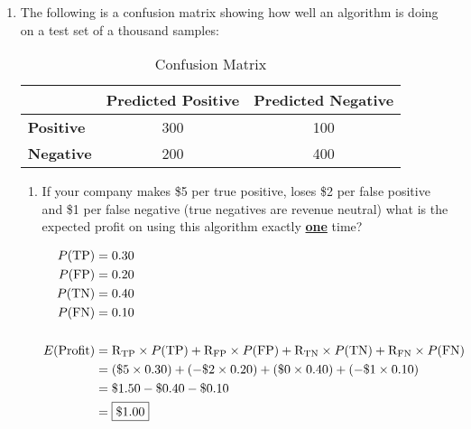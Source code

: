 \documentclass[12pt]{article}
\begin{document}
\begin{enumerate}
\begin{enumerate}
  \end{enumerate}
\newpage

\item The following is a confusion matrix showing how well an algorithm is doing on a test set of a thousand samples:
  \vspace{-2em}

  \begin{table}[h!]
    \begin{center}
      \caption{Confusion Matrix}
      \label{tab:table2}
      \begin{tabular}{l|c|c}
         & \textbf{Predicted Positive} & \textbf{Predicted Negative}\\
        \hline
        \textbf{Positive} & 300 & 100\\
        \textbf{Negative} & 200 & 400\\
      \end{tabular}
    \end{center}
  \end{table}

  \vspace{-2em}
  \begin{enumerate}
  \item If your company makes \$5 per true positive, loses \$2 per false positive and \$1 per false negative (true negatives are revenue neutral) what is the expected profit on using this algorithm exactly \underline{\textbf{one}} time?

  \vspace{-1em}

    \begin{align*}
        P(\text{TP}) &= 0.30\\
        P(\text{FP}) &= 0.20\\
        P(\text{TN}) &= 0.40\\
        P(\text{FN}) &= 0.10\\\\
        E(\text{Profit}) &= \text{R\textsubscript{TP}} \times P(\text{TP}) + \text{R\textsubscript{FP}} \times P(\text{FP}) + \text{R\textsubscript{TN}} \times P(\text{TN}) + \text{R\textsubscript{FN}} \times P(\text{FN})\\
        &= (\$5 \times 0.30) + (-\$2 \times 0.20) + (\$0 \times 0.40) + (-\$1 \times 0.10)\\
        &= \$1.50 - \$0.40 - \$0.10\\
        &= \boxed{\$1.00}
    \end{align*}

  \end{enumerate}
\newpage

\end{enumerate}
\end{document}

